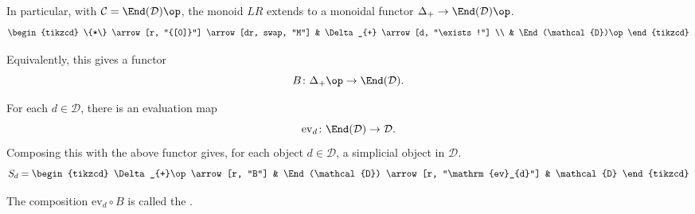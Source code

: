 \documentclass[main.tex]{subfiles}
\begin{document}
In particular, with $\mathcal{C} = \End(\mathcal{D})\op$, the monoid $LR$ extends to a monoidal functor $\Delta_{+} \to \End(\mathcal{D})\op$.
\begin{equation*}
  \begin{tikzcd}
    \{*\}
    \arrow[r, "{[0]}"]
    \arrow[dr, swap, "M"]
    & \Delta_{+}
    \arrow[d, "\exists!"]
    \\
    & \End(\mathcal{D})\op
  \end{tikzcd}
\end{equation*}

Equivalently, this gives a functor
\begin{equation*}
  B\colon \Delta_{+}\op \to \End(\mathcal{D}).
\end{equation*}

For each $d \in \mathcal{D}$, there is an evaluation map
\begin{equation*}
  \mathrm{ev}_{d}\colon \End(\mathcal{D}) \to \mathcal{D}.
\end{equation*}
Composing this with the above functor gives, for each object $d \in \mathcal{D}$, a simplicial object in $\mathcal{D}$.
\begin{equation*}
  S_{d} =
  \begin{tikzcd}
    \Delta_{+}\op
    \arrow[r, "B"]
    & \End(\mathcal{D})
    \arrow[r, "\mathrm{ev}_{d}"]
    & \mathcal{D}
  \end{tikzcd}
\end{equation*}

\begin{definition}
  \label{def:bar_construction}
  The composition $\mathrm{ev}_{d} \circ B$ is called the .
\end{definition}
\end{document}
